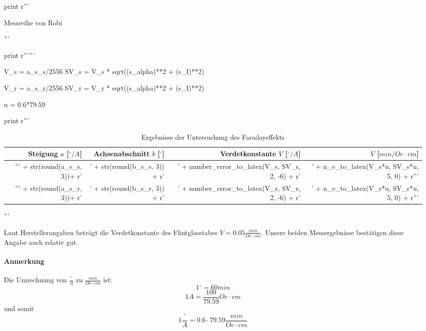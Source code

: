 \begin{python}
\begin{table}[H]
\begin{minipage}[b]{0.5\linewidth}
print r'''\caption{Messreihe von Robi}
	  \end{minipage}
          \end{table} '''




print r'''\faradayDesc'''

V_s = a_s_s/2556
SV_s = V_s * sqrt((s_alpha)**2 + (s_I)**2)

V_r = a_s_r/2556
SV_r = V_r * sqrt((s_alpha)**2 + (s_I)**2)

u = 0.6*79.59

print r'''
\begin{table}[H]
\begin{tabular}{rrrr}
 \toprule
 Steigung $a$ [${}^{\circ}/A$] & Achsenabschnitt $b$ [${}^{\circ}$] & Verdetkonstante $V$ [${}^{\circ}/A$] & $V$ [$min/Oe \cdot cm$] \\
 \midrule
''' + str(round(a_s_s, 3))+ r' & ' + str(round(b_s_s, 3)) + r' & ' + number_error_to_latex(V_s, SV_s, 2, -6) + r' & ' + n_e_to_latex(V_s*u, SV_s*u, 5, 0) + r'''\\
''' + str(round(a_s_r, 3))+ r' & ' + str(round(b_s_r, 3)) + r' & ' + number_error_to_latex(V_r, SV_r, 2, -6) + r' & ' + n_e_to_latex(V_r*u, SV_r*u, 5, 0) + r'''\\
 \bottomrule  
\end{tabular}
\caption{Ergebnisse der Untersuchung des Faradayeffekts}
\end{table}

'''

\end{python}

Laut Herstellerangaben beträgt die Verdetkonstante des Flintglasstabes $V = 0.05 \frac{min}{Oe \cdot cm}$. Unsere beiden Messergebnisse bestätigen diese Angabe auch relativ gut.

\paragraph{Anmerkung}
Die Umrechnung von $\frac{{}^{\circ}}{A}$ zu $\frac{min}{Oe \cdot cm}$ ist:
$$ 1 {}^{\circ} = 60 min $$
$$ 1 A = \frac{100}{79.59}Oe \cdot cm $$
und somit
$$ 1 \frac{{}^{\circ}}{A} = 0.6 \cdot 79.59  \frac{min}{Oe \cdot cm} $$
